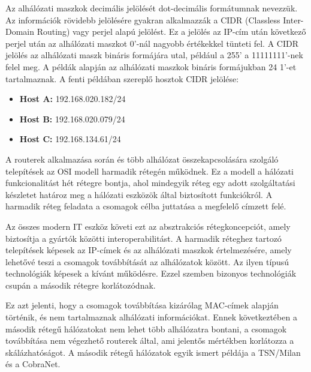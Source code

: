 Az alhálózati maszkok decimális jelölését dot-decimális formátumnak nevezzük. 
Az információk rövidebb jelölésére gyakran alkalmazzák a CIDR (Classless Inter-Domain Routing) 
vagy perjel alapú jelölést. Ez a jelölés az IP-cím után következő perjel után az alhálózati maszkot 0'-nál 
nagyobb értékekkel tünteti fel. A CIDR jelölés az alhálózati maszk bináris formájára utal, 
például a 255' a 11111111'-nek felel meg. A példák alapján az alhálózati maszkok bináris formájukban 24 1'-et tartalmaznak.
A fenti példában szereplő hosztok CIDR jelölése:

\begin{itemize}
    \item \textbf{Host A:} 192.168.020.182/24
    \item \textbf{Host B:} 192.168.020.079/24
    \item \textbf{Host C:} 192.168.134.61/24
\end{itemize}

A routerek alkalmazása során és több alhálózat összekapcsolására szolgáló telepítések az OSI modell harmadik rétegén működnek. 
Ez a modell a hálózati funkcionalitást hét rétegre bontja, ahol mindegyik réteg egy adott 
szolgáltatási készletet határoz meg a hálózati eszközök által biztosított funkciókról. 
A harmadik réteg feladata a csomagok célba juttatása a megfelelő címzett felé.

Az összes modern IT eszköz követi ezt az absztrakciós rétegkoncepciót, amely biztosítja a gyártók 
közötti interoperabilitást. A harmadik réteghez tartozó telepítések képesek az IP-címek és az 
alhálózati maszkok értelmezésére, amely lehetővé teszi a csomagok továbbítását az alhálózatok között. 
Az ilyen típusú technológiák képesek a kívánt működésre. Ezzel szemben bizonyos technológiák csupán a második rétegre korlátozódnak.

Ez azt jelenti, hogy a csomagok továbbítása kizárólag MAC-címek alapján történik, és nem 
tartalmaznak alhálózati információkat. Ennek következtében a második rétegű hálózatokat nem 
lehet több alhálózatra bontani, a csomagok továbbítása nem végezhető routerek által, ami 
jelentős mértékben korlátozza a skálázhatóságot. A második rétegű hálózatok egyik ismert példája a TSN/Milan és a CobraNet.

